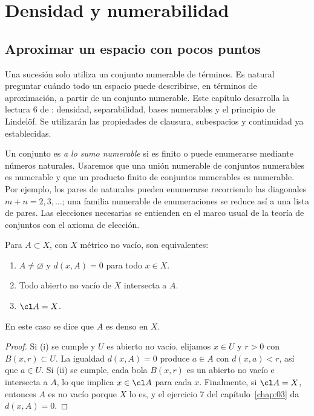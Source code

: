 \chapter{Densidad y numerabilidad}\label{chap:06}
\section{Aproximar un espacio con pocos puntos}
Una sucesión solo utiliza un conjunto numerable de términos. Es natural preguntar cuándo todo un espacio puede describirse, en términos de aproximación, a partir de un conjunto numerable. Este capítulo desarrolla la lectura 6 de \cite{valencia}: densidad, separabilidad, bases numerables y el principio de Lindelöf. Se utilizarán las propiedades de clausura, subespacios y continuidad ya establecidas.

Un conjunto es \emph{a lo sumo numerable} si es finito o puede enumerarse mediante números naturales. Usaremos que una unión numerable de conjuntos numerables es numerable y que un producto finito de conjuntos numerables es numerable. Por ejemplo, los pares de naturales pueden enumerarse recorriendo las diagonales $m+n=2,3,\ldots$; una familia numerable de enumeraciones se reduce así a una lista de pares. Las elecciones necesarias se entienden en el marco usual de la teoría de conjuntos con el axioma de elección.

\begin{teorema}\label{ch06:denso}
Para $A\subset X$, con $X$ métrico no vacío, son equivalentes:
\begin{enumerate}[label=(\roman*)]
\item $A\ne\varnothing$ y $d(x,A)=0$ para todo $x\in X$.
\item Todo abierto no vacío de $X$ intersecta a $A$.
\item $\cl A=X$.
\end{enumerate}
En este caso se dice que $A$ es denso en $X$.
\end{teorema}
\begin{proof}
Si (i) se cumple y $U$ es abierto no vacío, elijamos $x\in U$ y $r>0$ con $B(x,r)\subset U$. La igualdad $d(x,A)=0$ produce $a\in A$ con $d(x,a)<r$, así que $a\in U$. Si (ii) se cumple, cada bola $B(x,r)$ es un abierto no vacío e intersecta a $A$, lo que implica $x\in\cl A$ para cada $x$. Finalmente, si $\cl A=X$, entonces $A$ es no vacío porque $X$ lo es, y el ejercicio 7 del capítulo~\ref{chap:03} da $d(x,A)=0$.
\end{proof}

